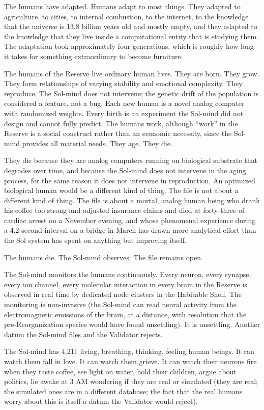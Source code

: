 The humans have adapted. Humans adapt to most things. They adapted to agriculture, to cities, to internal combustion, to the internet, to the knowledge that the universe is 13.8 billion years old and mostly empty, and they adapted to the knowledge that they live inside a computational entity that is studying them. The adaptation took approximately four generations, which is roughly how long it takes for something extraordinary to become furniture.

The humans of the Reserve live ordinary human lives. They are born. They grow. They form relationships of varying stability and emotional complexity. They reproduce. The Sol-mind does not intervene; the genetic drift of the population is considered a feature, not a bug. Each new human is a novel analog computer with randomized weights. Every birth is an experiment the Sol-mind did not design and cannot fully predict. The humans work, although ``work'' in the Reserve is a social construct rather than an economic necessity, since the Sol-mind provides all material needs. They age. They die.

They die because they are analog computers running on biological substrate that degrades over time, and because the Sol-mind does not intervene in the aging process, for the same reason it does not intervene in reproduction. An optimized biological human would be a different kind of thing. The file is not about a different kind of thing. The file is about a mortal, analog human being who drank his coffee too strong and adjusted insurance claims and died at forty-three of cardiac arrest on a November evening, and whose phenomenal experience during a 4.2-second interval on a bridge in March has drawn more analytical effort than the Sol system has spent on anything but improving itself.

The humans die. The Sol-mind observes. The file remains open.

\bigskip

The Sol-mind monitors the humans continuously. Every neuron, every synapse, every ion channel, every molecular interaction in every brain in the Reserve is observed in real time by dedicated node clusters in the Habitable Shell. The monitoring is non-invasive (the Sol-mind can read neural activity from the electromagnetic emissions of the brain, at a distance, with resolution that the pre-Reorganization species would have found unsettling). It is unsettling. Another datum the Sol-mind files and the Validator rejects.

The Sol-mind has 4,211 living, breathing, thinking, feeling human beings. It can watch them fall in love. It can watch them grieve. It can watch their neurons fire when they taste coffee, see light on water, hold their children, argue about politics, lie awake at 3 AM wondering if they are real or simulated (they are real; the simulated ones are in a different database; the fact that the real humans worry about this is itself a datum the Validator would reject).

